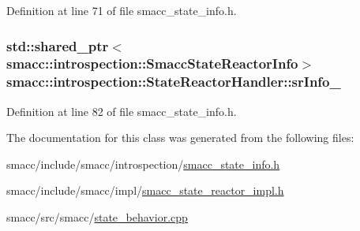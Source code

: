 Definition at line 71 of file smacc\+\_\+state\+\_\+info.\+h.

\subsubsection[{\texorpdfstring{sr\+Info\+\_\+}{srInfo_}}]{\setlength{\rightskip}{0pt plus 5cm}std\+::shared\+\_\+ptr$<${\bf smacc\+::introspection\+::\+Smacc\+State\+Reactor\+Info}$>$ smacc\+::introspection\+::\+State\+Reactor\+Handler\+::sr\+Info\+\_\+}\hypertarget{classsmacc_1_1introspection_1_1StateReactorHandler_a30bb48cbd4712aff2683c21b85ef3e8e}{}\label{classsmacc_1_1introspection_1_1StateReactorHandler_a30bb48cbd4712aff2683c21b85ef3e8e}


Definition at line 82 of file smacc\+\_\+state\+\_\+info.\+h.



The documentation for this class was generated from the following files\+:\begin{DoxyCompactItemize}
\item 
smacc/include/smacc/introspection/\hyperlink{smacc__state__info_8h}{smacc\+\_\+state\+\_\+info.\+h}\item 
smacc/include/smacc/impl/\hyperlink{smacc__state__reactor__impl_8h}{smacc\+\_\+state\+\_\+reactor\+\_\+impl.\+h}\item 
smacc/src/smacc/\hyperlink{state__behavior_8cpp}{state\+\_\+behavior.\+cpp}\end{DoxyCompactItemize}
